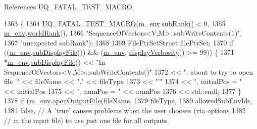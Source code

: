 References U\-Q\-\_\-\-F\-A\-T\-A\-L\-\_\-\-T\-E\-S\-T\-\_\-\-M\-A\-C\-R\-O.


\begin{DoxyCode}
1363 \{
1364   \hyperlink{_defines_8h_a56d63d18d0a6d45757de47fcc06f574d}{UQ\_FATAL\_TEST\_MACRO}(\hyperlink{class_q_u_e_s_o_1_1_base_vector_sequence_a8e8824d2a63c5a43bcc6473e3a0491e8}{m\_env}.\hyperlink{class_q_u_e_s_o_1_1_base_environment_a172d52f993f1322ed45aaddf71518dbb}{subRank}() < 0,
1365                       \hyperlink{class_q_u_e_s_o_1_1_base_vector_sequence_a8e8824d2a63c5a43bcc6473e3a0491e8}{m\_env}.\hyperlink{class_q_u_e_s_o_1_1_base_environment_a78b57112bbd0e6dd0e8afec00b40ffa7}{worldRank}(),
1366                       \textcolor{stringliteral}{"SequenceOfVectors<V,M>::subWriteContents(1)"},
1367                       \textcolor{stringliteral}{"unexpected subRank"});
1368 
1369   FilePtrSetStruct filePtrSet;
1370   \textcolor{keywordflow}{if} ((\hyperlink{class_q_u_e_s_o_1_1_base_vector_sequence_a8e8824d2a63c5a43bcc6473e3a0491e8}{m\_env}.\hyperlink{class_q_u_e_s_o_1_1_base_environment_a8a0064746ae8dddfece4229b9ad374d6}{subDisplayFile}()) && (\hyperlink{class_q_u_e_s_o_1_1_base_vector_sequence_a8e8824d2a63c5a43bcc6473e3a0491e8}{m\_env}.
      \hyperlink{class_q_u_e_s_o_1_1_base_environment_a1fe5f244fc0316a0ab3e37463f108b96}{displayVerbosity}() >= 99)) \{
1371     *\hyperlink{class_q_u_e_s_o_1_1_base_vector_sequence_a8e8824d2a63c5a43bcc6473e3a0491e8}{m\_env}.\hyperlink{class_q_u_e_s_o_1_1_base_environment_a8a0064746ae8dddfece4229b9ad374d6}{subDisplayFile}() << \textcolor{stringliteral}{"In SequenceOfVectors<V,M>::subWriteContents()"}
1372                             << \textcolor{stringliteral}{": about to try to open file '"} << fileName << \textcolor{stringliteral}{"."} << fileType
1373                             << \textcolor{stringliteral}{"'"}
1374                             << \textcolor{stringliteral}{", initialPos = "} << initialPos
1375                             << \textcolor{stringliteral}{", numPos = "}     << numPos
1376                             << std::endl;
1377   \}
1378   \textcolor{keywordflow}{if} (\hyperlink{class_q_u_e_s_o_1_1_base_vector_sequence_a8e8824d2a63c5a43bcc6473e3a0491e8}{m\_env}.\hyperlink{class_q_u_e_s_o_1_1_base_environment_ab8fe853074f12ea34e18724119a2fc75}{openOutputFile}(fileName,
1379                            fileType,
1380                            allowedSubEnvIds,
1381                            \textcolor{keyword}{false}, \textcolor{comment}{// A 'true' causes problems when the user chooses (via options}
1382                                   \textcolor{comment}{// in the input file) to use just one file for all outputs.}

\end{DoxyCode}

